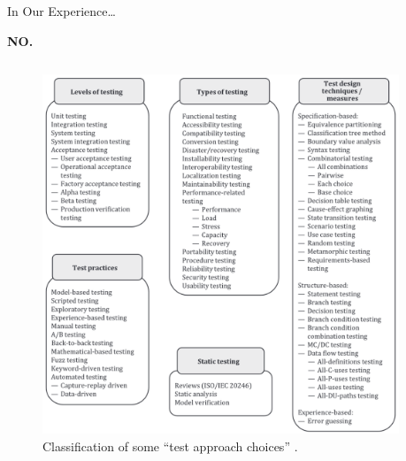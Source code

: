\documentclass[22pt]{beamer}
\begin{document}
\begin{frame}[fragile]
\begin{textblock}{7.25}
        \begin{block}{\fontsize{37}{20}\selectfont In Our Experience\dots}
            \vspace{5mm}
            \begin{center}
                {\fontsize{185}{20}\selectfont \textbf{NO.}}
            \end{center}
            \begin{columns}
                \begin{column}{0.7\textwidth}
                    \begin{center}
                        \begin{figure}
                            \centering
                            \includegraphics[width=\textwidth]{test approach choices.png}
                            \vspace{-7mm}
                            \caption{Classification of some ``test approach choices''
                                \cite[p.~22]{IEEE2022}.}
                            \label{Fig:approach-choices}
                        \end{figure}
                    \end{center}
                \end{column}
                \begin{column}{0.25\textwidth}

\end{column}
\end{columns}
\end{block}
\end{textblock}
\end{frame}
\end{document}
